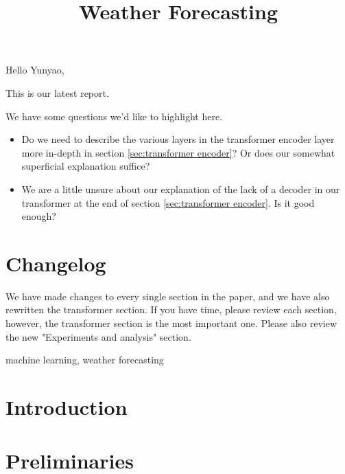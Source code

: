 


Hello Yunyao,

This is our latest report.

We have some questions we'd like to highlight here.

\begin{itemize}
    \item Do we need to describe the various layers in the transformer encoder layer more in-depth in section \ref{sec:transformer encoder}? Or does our somewhat superficial explanation suffice? 
    \item We are a little unsure about our explanation of the lack of a decoder in our transformer at the end of section \ref{sec:transformer encoder}. Is it good enough?
\end{itemize}

\section{Changelog}
We have made changes to every single section in the paper, and we have also rewritten the transformer section. 
If you have time, please review each section, however, the transformer section is the most important one.
Please also review the new "Experiments and analysis" section.

\newpage

\title{Weather Forecasting}
\author{
    \and
    \and
    \and
}

\maketitle

\begin{abstract}
\end{abstract}

\begin{IEEEkeywords}
machine learning, weather forecasting
\end{IEEEkeywords}

\section{Introduction}


\section{Preliminaries}


